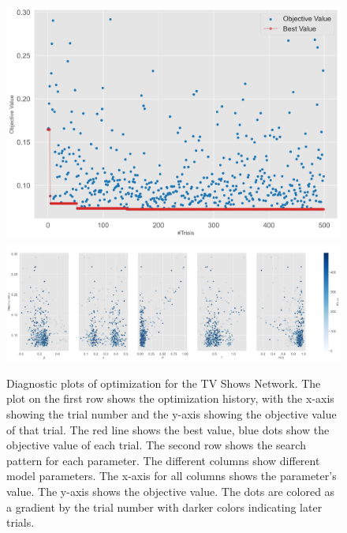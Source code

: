 \documentclass[11pt]{article}
\begin{document}
\begin{figure}[H]
    \centering
    \includegraphics[width=.7\linewidth]{../plots/overall/Optimization_History_tvshows.png}
    \includegraphics[width=.7\linewidth]{../plots/overall/Plot_Slice_tvshows.png}
  \caption{Diagnostic plots of optimization for the TV Shows Network. The plot on the first row shows the optimization history, with the x-axis showing the trial number and the y-axis showing the objective value of that trial. The red line shows the best value, blue dots show the objective value of each trial. The second row shows the search pattern for each parameter. The different columns show different model parameters. The x-axis for all columns shows the parameter's value. The y-axis shows the objective value. The dots are colored as a gradient by the trial number with darker colors indicating later trials.}
  \label{appendix:optimization_tvshows}
\end{figure}
\end{document}
